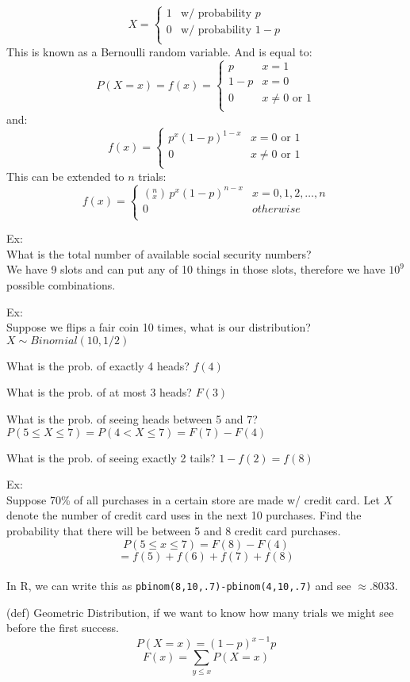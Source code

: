\documentclass[12pt]{article}
\begin{document}
\[X= \begin{cases}
    1 & \text{w/ probability } p\\
    0 & \text{w/ probability } 1-p\\
\end{cases}\]
This is known as a Bernoulli random variable. And is equal to:
\[P(X=x)=f(x)=\begin{cases}
    p & x=1\\
    1-p & x=0\\
    0 & x\not=0\text{ or }1\\
\end{cases}\]
and:
\[f(x)=\begin{cases}
    p^x(1-p)^{1-x} & x=0\text{ or }1\\
    0 & x\not=0\text{ or }1\\
\end{cases}\]
This can be extended to \(n\) trials:
\[f(x)=\begin{cases}
    (_x^n)\,p^x(1-p)^{n-x} & x=0,1,2,\dots,n\\
    0 & otherwise\\
\end{cases}\]

Ex:\\
What is the total number of available social security numbers?\\
We have 9 slots and can put any of 10 things in those slots, therefore we have \(10^9\) possible combinations. 

Ex:\\
Suppose we flips a fair coin 10 times, what is our distribution?  \(X\sim Binomial(10,1/2)\)

What is the prob. of exactly 4 heads? \(f(4)\) 

What is the prob. of at most 3 heads? \(F(3)\) 

What is the prob. of seeing heads between 5 and 7? \\\(P(5\leq X \leq 7) = P(4 < X \leq 7) = F(7)-F(4)\)

What is the prob. of seeing exactly 2 tails? \(1-f(2)=f(8)\)

Ex:\\
Suppose 70\% of all purchases in a certain store are made w/ credit card. Let \(X\) denote the number of credit card uses in the next 10 purchases. Find the probability that there will be between 5 and 8 credit card purchases.\[P(5\leq x \leq7) = F(8)-F(4)\]\[=f(5)+f(6)+f(7)+f(8)\]\\
In R, we can write this as \texttt{pbinom(8,10,.7)-pbinom(4,10,.7)} and see \(\approx .8033\).

(def) Geometric Distribution, if we want to know how many trials we might see before the first success.
\[P(X=x)=(1-p)^{x-1}p\]\[F(x)=\sum_{y\leq x}P(X=x)\]
\end{document}
